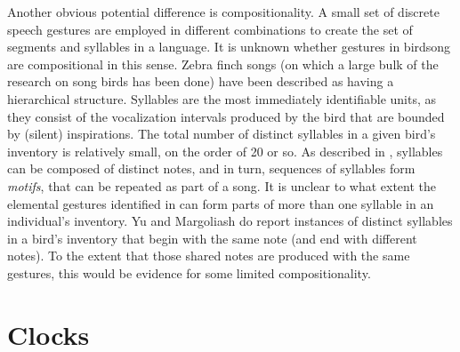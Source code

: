 \documentclass[output=paper,
modfonts
]{LSP/langsci}
\begin{document}
Another obvious potential difference is compositionality. A small set of discrete speech gestures are employed in different combinations to create the set of segments and syllables in a language. It is unknown whether gestures in birdsong are compositional in this sense. Zebra finch songs (on which a large bulk of the research on song birds has been done) have been described as having a hierarchical structure. Syllables are the most immediately identifiable units, as they consist of the vocalization intervals produced by the bird that are bounded by (silent) inspirations. The total number of distinct syllables in a given bird's inventory is relatively small, on the order of 20 or so. As described in \citet{YuMargoliash96},  syllables can be composed of distinct notes, and in turn, sequences of syllables form \textit{motifs}, that can be repeated as part of a song. It is unclear to what extent the elemental gestures identified in \citet{Amador2013} can form parts of more than one syllable in an individual's inventory.  Yu and Margoliash \citeyearpar{YuMargoliash96} do report instances of distinct syllables in a bird's inventory that begin with the same note (and end with different notes). To the extent that those shared notes are produced with the same gestures, this would be evidence for some limited compositionality.

\section{Clocks}
\end{document}
